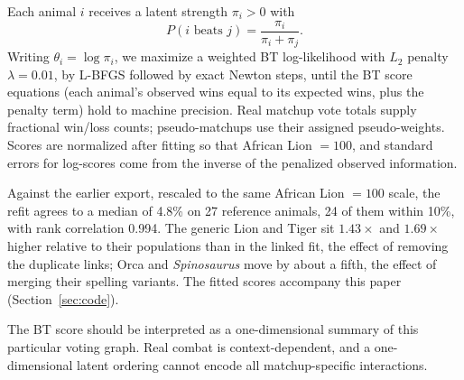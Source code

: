\documentclass[11pt]{article}
\begin{document}
Each animal $i$ receives a latent strength $\pi_i>0$ with
\begin{equation}
P(i\text{ beats }j)=\frac{\pi_i}{\pi_i+\pi_j}.
\end{equation}
Writing $\theta_i=\log\pi_i$, we maximize a weighted BT log-likelihood with $L_2$ penalty $\lambda=0.01$, by L-BFGS followed by exact Newton steps, until the BT score equations (each animal's observed wins equal to its expected wins, plus the penalty term) hold to machine precision. Real matchup vote totals supply fractional win/loss counts; pseudo-matchups use their assigned pseudo-weights. Scores are normalized after fitting so that African Lion $=100$, and standard errors for log-scores come from the inverse of the penalized observed information.

Against the earlier export, rescaled to the same African Lion $=100$ scale, the refit agrees to a median of 4.8\% on 27 reference animals, 24 of them within 10\%, with rank correlation 0.994. The generic Lion and Tiger sit $1.43\times$ and $1.69\times$ higher relative to their populations than in the linked fit, the effect of removing the duplicate links; Orca and \textit{Spinosaurus} move by about a fifth, the effect of merging their spelling variants. The fitted scores accompany this paper (Section~\ref{sec:code}).

The BT score should be interpreted as a one-dimensional summary of this particular voting graph. Real combat is context-dependent, and a one-dimensional latent ordering cannot encode all matchup-specific interactions.
\end{document}
